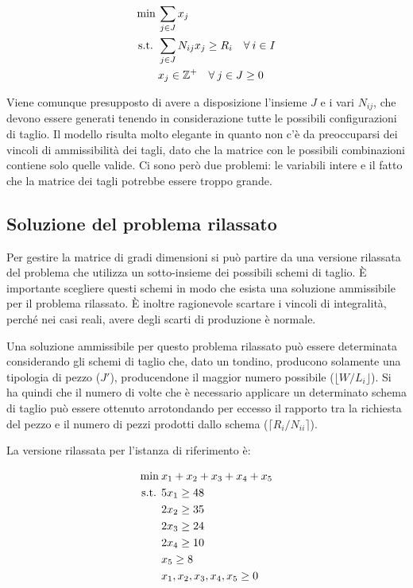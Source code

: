 \begin{align*}
\min\:& \sum\limits_{j \in J} x_j  \\
\text{s.t. }  & \sum\limits_{j \in J} N_{ij}x_j \geq R_i  \quad \forall\: i \in I\\
& x_j \in \mathbb{Z}^+ \quad \forall \: j \in J \geq 0
\end{align*}

Viene comunque presupposto di avere a disposizione l'insieme $J$ e i vari $N_{ij}$, che devono essere generati tenendo in considerazione tutte le possibili configurazioni di taglio.
Il modello risulta molto elegante in quanto non c'è da preoccuparsi dei vincoli di ammissibilità dei tagli, dato che la matrice con le possibili combinazioni contiene solo quelle valide. 
Ci sono però due problemi: le variabili intere e il fatto che la matrice dei tagli potrebbe essere troppo grande.

\subsection{Soluzione del problema rilassato}

Per gestire la matrice di gradi dimensioni si può partire da una versione rilassata del problema che utilizza un sotto-insieme dei possibili schemi di taglio. \`E importante scegliere questi schemi in modo che esista una soluzione ammissibile per il problema rilassato.
\`E inoltre ragionevole scartare i vincoli di integralità, perché nei casi reali, avere degli scarti di produzione è normale.

Una soluzione ammissibile per questo problema rilassato può essere determinata considerando gli schemi di taglio che, dato un tondino, producono solamente una tipologia di pezzo ($J'$), producendone il maggior numero possibile ($\lfloor W /L_i \rfloor$).
Si ha quindi che il numero di volte che è necessario applicare un determinato schema di taglio può essere ottenuto arrotondando per eccesso il rapporto tra la richiesta del pezzo e il numero di pezzi prodotti dallo schema ($\lceil R_i /N_{ii} \rceil$).

La versione rilassata per l'istanza di riferimento è:

\begin{align*}
\min\:& x_1+x_2+x_3+x_4+x_5 \\
\text{s.t. } &5x_1 \geq 48 \\
	&2x_2 \geq 35 \\
	&2x_3 \geq 24 \\
	&2x_4 \geq 10 \\
	&x_5 \geq 8 \\
	&x_1,x_2,x_3,x_4,x_5\geq 0 \\
\end{align*}

